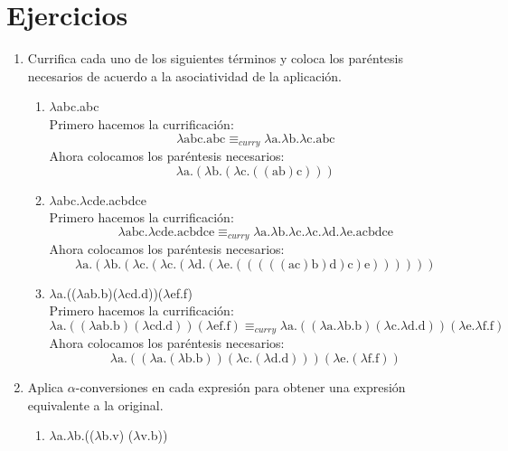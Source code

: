 \documentclass[11pt]{article}
\begin{document}
\section*{Ejercicios}

\begin{enumerate}[leftmargin=0.8cm]
    \item Currifica cada uno de los siguientes términos y coloca los paréntesis necesarios de acuerdo a la asociatividad de la aplicación.
    \begin{enumerate}
        \item $\lambda$abc.abc\\
        Primero hacemos la currificación:
        \[
            \lambda\text{abc.abc} \equiv _{curry} \lambda \text{a.}\lambda \text{b.}\lambda \text{c.abc}
        \]
        Ahora colocamos los paréntesis necesarios:
        \[
            \lambda \text{a.}(\lambda \text{b.}(\lambda \text{c.}((\text{ab})\text{c})))
        \]
        \item $\lambda$abc.$\lambda$cde.acbdce\\
        Primero hacemos la currificación:
        \[
            \lambda\text{abc.}\lambda\text{cde.acbdce} \equiv _{curry} \lambda \text{a.}\lambda \text{b.}\lambda \text{c.}\lambda \text{c.}\lambda \text{d.}\lambda \text{e.acbdce}
        \]
        Ahora colocamos los paréntesis necesarios:
        \[
            \lambda \text{a.}(\lambda \text{b.}(\lambda \text{c.}(\lambda \text{c.}(\lambda \text{d.}(\lambda \text{e.}(((((\text{ac})\text{b})\text{d})\text{c})\text{e}))))))
        \]
        \item $\lambda$a.(($\lambda$ab.b)($\lambda$cd.d))($\lambda$ef.f)\\
        Primero hacemos la currificación:
        \[
            \lambda\text{a.}((\lambda\text{ab.b})(\lambda\text{cd.d}))(\lambda\text{ef.f}) \equiv _{curry} \lambda \text{a.}((\lambda \text{a.}\lambda \text{b.b})(\lambda \text{c.}\lambda \text{d.d}))(\lambda \text{e.}\lambda \text{f.f})
        \]
        Ahora colocamos los paréntesis necesarios:
        \[
            \lambda \text{a.}((\lambda \text{a.}(\lambda \text{b.b}))(\lambda \text{c.}(\lambda \text{d.d})))(\lambda \text{e.}(\lambda \text{f.f}))
        \]
    \end{enumerate}
    \item Aplica $\alpha$-conversiones en cada expresión para obtener una expresión equivalente a la original.
    \begin{enumerate}
        \item $\lambda$a.$\lambda$b.(($\lambda$b.v) ($\lambda$v.b))

\end{enumerate}
\end{enumerate}
\end{document}
